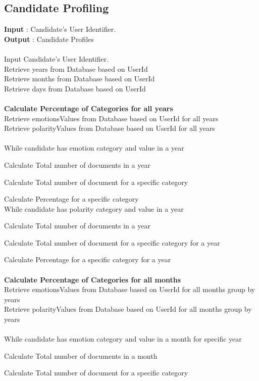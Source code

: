 \documentclass[oneside,a4paper,12pt]{pictreport}
\begin{document}
\subsection{Candidate Profiling}
\textbf{Input} : Candidate's User Identifier.\\
\textbf{Output} : Candidate Profiles\\\\
Input Candidate's User Identifier.\\
Retrieve years from Database based on UserId\\
Retrieve months from Database based on UserId\\
Retrieve days from Database based on UserId\\\\
\textbf{Calculate Percentage of Categories for all years}\\
Retrieve emotionsValues from Database based on UserId for all years\\
Retrieve polarityValues from Database based on UserId for all years\\\\
While candidate has emotion category and value in a year
	\par Calculate Total number of documents in a year
	\par Calculate Total number of document for a specific category
	\par Calculate Percentage for a specific category\\
While candidate has polarity category and value in a year
	\par Calculate Total number of documents in a year
	\par Calculate Total number of document for a specific category for a year
	\par Calculate Percentage for a specific category for a year\\\\
\textbf{Calculate Percentage of Categories for all months}\\
Retrieve emotionsValues from Database based on UserId for all months group by years\\
Retrieve polarityValues from Database based on UserId for all months group by years\\\\
While candidate has emotion category and value in a month for specific year
	\par Calculate Total number of documents in a month
	\par Calculate Total number of document for a specific category
\end{document}
